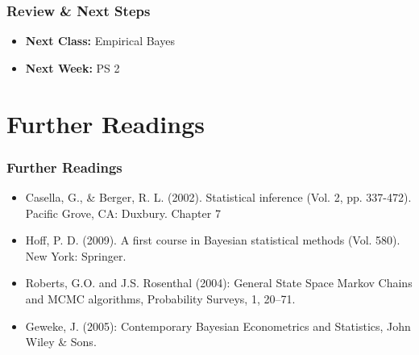 \documentclass[
  shownotes,
  xcolor={svgnames},
  hyperref={colorlinks,citecolor=DarkBlue,linkcolor=DarkRed,urlcolor=DarkBlue}
  , aspectratio=169]{beamer}
\begin{document}
\begin{frame}
\frametitle{Review \& Next Steps}
  
  \begin{itemize} 
    
  \item  {\bf Next Class:} Empirical Bayes
    \bigskip  
  \item  {\bf Next Week:} PS 2
  
  \end{itemize}


\end{frame}

\section{Further Readings}
\begin{frame}
\frametitle{Further Readings}

\begin{itemize}
  \item Casella, G., \& Berger, R. L. (2002). Statistical inference (Vol. 2, pp. 337-472). Pacific Grove, CA: Duxbury. Chapter 7
  \medskip
  \item Hoff, P. D. (2009). A first course in Bayesian statistical methods (Vol. 580). New York: Springer.
  \medskip
    \item Roberts, G.O. and J.S. Rosenthal (2004): General State Space Markov Chains and MCMC algorithms, Probability Surveys, 1, 20–71.
  \medskip
  \item Geweke, J. (2005): Contemporary Bayesian Econometrics and Statistics, John Wiley \& Sons.
  
\end{itemize}

\end{frame}

\end{document}
